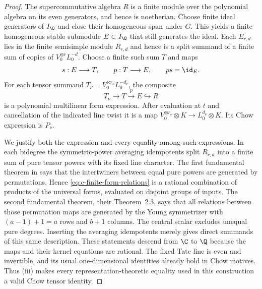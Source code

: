 \begin{proof}
The supercommutative algebra $R$ is a finite module over the
polynomial algebra on its even generators, and hence is
noetherian.  Choose finite ideal generators of $I_\Q$ and close
their homogeneous span under $G$.  This yields a finite
homogeneous stable submodule $E\subset I_\Q$ that still generates
the ideal.  Each $E_{r,d}$ lies in the finite semisimple module
$R_{r,d}$ and hence is a split summand of a finite sum of copies
of $V_0^{\otimes r}L_0^{-d}$.  Choose a finite such sum $T$ and
maps
\[
 s:E\longrightarrow T,\qquad p:T\longrightarrow E,
 \qquad ps=\id_E.
\]
For each tensor summand $T_\nu=V_0^{\otimes r_\nu}L_0^{-d_\nu}$,
the composite
\begin{equation}
 T_\nu\longrightarrow T\xrightarrow{p}E\hookrightarrow R
 \label{eq:c-finite-form-relations}
\end{equation}
is a polynomial multilinear form expression.  After evaluation
at $t$ and cancellation of the indicated line twist it is a map
$V_0^{\otimes r_\nu}\otimes K\to L_0^{d_\nu}\otimes K$.
Its Chow expression is $P_\nu$.

We justify both the expression and every equality among such
expressions.  In each bidegree the symmetric-power averaging
idempotents split $R_{r,d}$ into a finite sum of pure tensor
powers with its fixed line character.  The first fundamental
theorem in \citet[Theorem~2.1]{c_lehrerzhang2021super} says that
the intertwiners between equal pure powers are generated by
permutations.  Hence \eqref{eq:c-finite-form-relations} is a rational combination of products
of the universal forms, evaluated on disjoint groups of inputs.
The second fundamental theorem, their Theorem~2.3, says that all
relations between those permutation maps are generated by the
Young symmetrizer with $(a-1)+1=a$ rows and $b+1$ columns.
The central scalar excludes unequal pure degrees.  Inserting
the averaging idempotents merely gives direct summands of this
same description.  These statements descend from $\C$ to $\Q$
because the maps and their kernel equations are rational.
The fixed Tate line is even and invertible, and its usual
one-dimensional identities already hold in Chow motives.
Thus (iii) makes every representation-theoretic equality used
in this construction a valid Chow tensor identity.


\end{proof}
